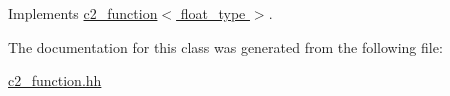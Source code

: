 Implements \hyperlink{classc2__function_a44e0201159111350be7f746fc9026f67}{c2\+\_\+function$<$ float\+\_\+type $>$}.



The documentation for this class was generated from the following file\+:\begin{DoxyCompactItemize}
\item 
\hyperlink{c2__function_8hh}{c2\+\_\+function.\+hh}\end{DoxyCompactItemize}
